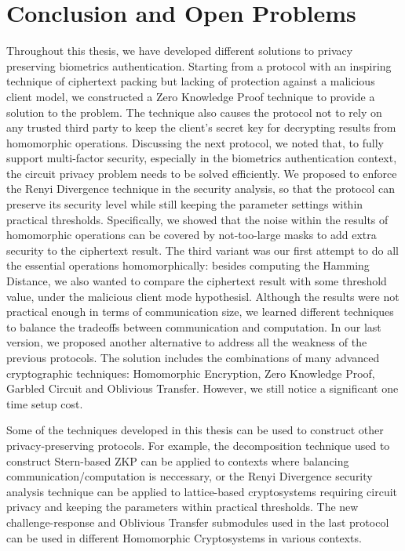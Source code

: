 \chapter{Conclusion and Open Problems}
\label{chap:conclusion}

\ifpdf
    \graphicspath{{Chapter8/Figs/Raster/}{Chapter8/Figs/PDF/}{Chapter8/Figs/}}
\else
    \graphicspath{{Chapter8/Figs/Vector/}{Chapter8/Figs/}}
\fi


Throughout this thesis, we have developed different solutions to privacy
preserving biometrics authentication. Starting from a protocol with an inspiring
technique of ciphertext packing but lacking of protection against a malicious
client model, we constructed a Zero Knowledge Proof technique to provide a
solution to the problem. The technique also causes the protocol not to rely on any
trusted third party to keep the client's secret key for decrypting results from
homomorphic operations. Discussing the next protocol, we noted that, to fully support
multi-factor security, especially in the biometrics authentication context, the
circuit privacy problem needs to be solved efficiently. We proposed to enforce the Renyi
Divergence technique in the security analysis, so that the protocol can preserve
its security level while still keeping the parameter settings within practical
thresholds. Specifically, we showed that the noise within the results of homomorphic
operations can be covered by not-too-large masks to add extra security to the
ciphertext result. The third variant was our first attempt to do all the
essential operations homomorphically: besides computing the Hamming
Distance, we also wanted to compare the ciphertext result with some threshold
value, under the malicious client mode hypothesisl. Although the results were not practical
enough in terms of communication size, we learned different techniques to
balance the tradeoffs between communication and computation. In our last
version, we proposed another alternative to address all the weakness of the
previous protocols. The solution includes the combinations of many advanced
cryptographic techniques: Homomorphic Encryption, Zero Knowledge Proof, Garbled
Circuit and Oblivious Transfer. However, we still notice a significant one time
setup cost.

Some of the techniques developed in this thesis can be used to construct other
privacy-preserving protocols. For example, the decomposition technique used to
construct Stern-based ZKP can be applied to contexts where balancing
communication/computation is neccessary, or the Renyi Divergence security
analysis technique can be applied to lattice-based cryptosystems requiring
circuit privacy and keeping the parameters within practical thresholds. The
new challenge-response and Oblivious Transfer submodules used in the last
protocol can be used in different Homomorphic Cryptosystems in various contexts.

